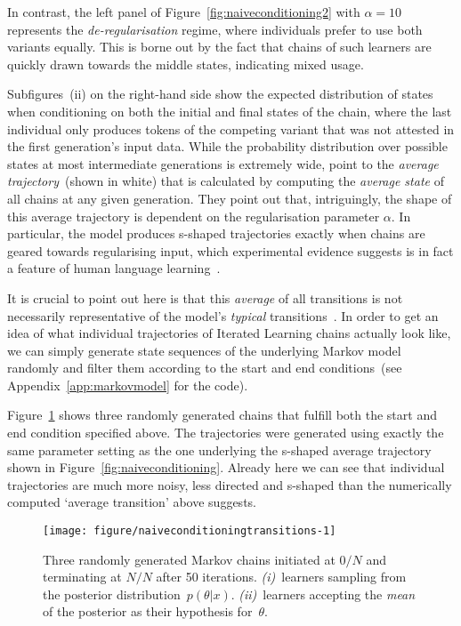 In contrast, the left panel of Figure~\ref{fig:naiveconditioning2} with $\alpha=10$ represents the \emph{de-regularisation} regime, where individuals prefer to use both variants equally. This is borne out by the fact that chains of such learners are quickly drawn towards the middle states, indicating mixed usage.

Subfigures~(ii) on the right-hand side show the expected distribution of states when conditioning on both the initial and final states of the chain, where the last individual only produces tokens of the competing variant that was not attested in the first generation's input data. While the probability distribution over possible states at most intermediate generations is extremely wide, \citeauthor{Reali2010} point to the \emph{average trajectory}~(shown in white) that is calculated by computing the \emph{average state} of all chains at any given generation. They point out that, intriguingly, the shape of this average trajectory is dependent on the regularisation parameter $\alpha$. In particular, the model produces s-shaped trajectories exactly when chains are geared towards regularising input, which experimental evidence suggests is in fact a feature of human language learning~\citep{HudsonKam2005,Reali2009,Smith2010}.

It is crucial to point out here is that this \emph{average} of all transitions is not necessarily representative of the model's \emph{typical} transitions~\citep{Blythe2012neutral}. In order to get an idea of what individual trajectories of Iterated Learning chains actually look like, we can simply generate state sequences of the underlying Markov model randomly and filter them according to the start and end conditions~(see Appendix~\ref{app:markovmodel} for the code).

Figure~\ref{fig:naiveconditioningtransitions} shows three randomly generated chains that fulfill both the start and end condition specified above. The trajectories were generated using exactly the same parameter setting as the one underlying the s-shaped average trajectory shown in Figure~\ref{fig:naiveconditioning}. Already here we can see that individual trajectories are much more noisy, less directed and s-shaped than the numerically computed `average transition' above suggests.

\begin{figure}[htbp]

{\centering \texttt{[image: figure/naiveconditioningtransitions-1]} 

}

\caption[Three randomly generated Markov chains initiated at $0/N$ and terminating at $N/N$ after 50 iterations.]{Three randomly generated Markov chains initiated at $0/N$ and terminating at $N/N$ after 50 iterations. \emph{(i)}~learners sampling from the posterior distribution~$p(\theta|x)$. \emph{(ii)}~learners accepting the \emph{mean} of the posterior as their hypothesis for~$\theta$.}\label{fig:naiveconditioningtransitions}
\end{figure}



